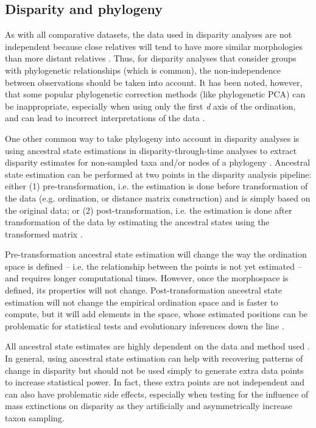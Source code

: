 \documentclass[12pt,letterpaper]{article}
\begin{document}
\subsection{Disparity and phylogeny} \label{section:phylo}

As with all comparative datasets, the data used in disparity analyses are not independent because close relatives will tend to have more similar morphologies than more distant relatives \citep{Harvey1998}.
Thus, for disparity analyses that consider groups with phylogenetic relationships (which is common), the non-independence between observations should be taken into account.
It has been noted, however, that some popular phylogenetic correction methods (like phylogenetic PCA) can be inappropriate, especially when using only the first \textit{d} axis of the ordination, and can lead to incorrect interpretations of the data \citep[such as wrongly supporting ``early burst'' type patterns;][]{Uyeda2015}.

One other common way to take phylogeny into account in disparity analyses is using ancestral state estimations in disparity-through-time analyses to extract disparity estimates for non-sampled taxa and/or nodes of a phylogeny \citep{brusatte2011phylogenetic}.
Ancestral state estimation can be performed at two points in the disparity analysis pipeline: either (1) pre-transformation, i.e. the estimation is done before transformation of the data (e.g. ordination, or distance matrix construction) and is simply based on the original data; or (2) post-transformation, i.e. the estimation is done after transformation of the data by estimating the ancestral states using the transformed matrix \citep[e.g. the ordination scores;][]{lloyd2018}.

Pre-transformation ancestral state estimation will change the way the ordination space is defined -- i.e.
the relationship between the points is not yet estimated -- and requires longer computational times.
However, once the morphospace is defined, its properties will not change.
Post-transformation ancestral state estimation will not change the empirical ordination space and is faster to compute, but it will add elements in the space, whose estimated positions can be problematic for statistical tests and evolutionary inferences down the line \citep{lloyd2018}.

All ancestral state estimates are highly dependent on the data and method used \cite{Louca2019}.
In general, using ancestral state estimation can help with recovering patterns of change in disparity but should not be used simply to generate extra data points to increase statistical power.
In fact, these extra points are not independent and can also have problematic side effects, especially when testing for the influence of mass extinctions on disparity as they artificially and asymmetrically increase taxon sampling.
\end{document}
